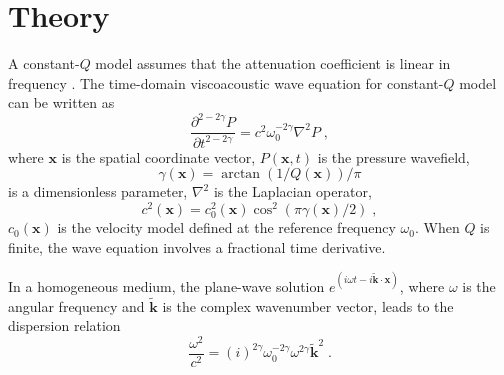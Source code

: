 \section{Theory}
A constant-$Q$ model assumes that the attenuation coefficient is linear in frequency \cite[]{kja79}. 
The time-domain viscoacoustic wave equation for constant-$Q$ model can be written as \cite[]{carc02}
\begin{equation}
 \label{eq:caputo}
 \frac{\partial^{2-2\gamma} P}{\partial t^{2-2\gamma}} = c^2\omega_0^{-2\gamma}\nabla^2 P \;,
\end{equation}
where $\mathbf{x}$ is the spatial coordinate vector, $P(\mathbf{x},t)$ is the pressure wavefield, 
\begin{equation}
\gamma(\mathbf{x})=\arctan(1/Q(\mathbf{x}))/\pi
\end{equation}
is a dimensionless parameter, $\nabla^2$ is the Laplacian operator,
\begin{equation}
c^2(\mathbf{x})=c_0^2(\mathbf{x})\cos^2(\pi\gamma(\mathbf{x})/2) \; ,
\end{equation}
 $c_0(\mathbf{x})$ is the velocity model defined at the reference frequency $\omega_0$. When $Q$ is finite, the wave equation involves a fractional time derivative. 

In a homogeneous medium,  the plane-wave solution $e^{(i\omega t - i\tilde{\mathbf{k}}\cdot\mathbf{x})}$, where $\omega$ is the angular frequency and $\tilde{\mathbf{k}}$ is the complex wavenumber vector, leads to the dispersion relation
\begin{equation}
  \label{eq:disp1}
  \frac{\omega^2}{c^2} = (i)^{2\gamma} \omega_0^{-2\gamma}\omega^{2\gamma}\tilde{\mathbf{k}}^2 \;.
\end{equation}

